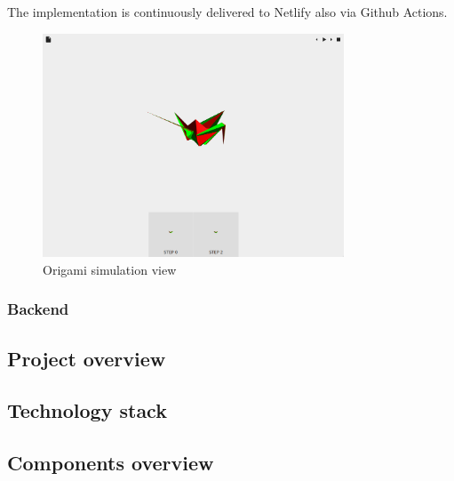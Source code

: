 The implementation is continuously delivered to Netlify also via Github Actions.


\begin{figure}[H]
\caption{Origami simulation view}
  \centering
    \includegraphics[width=0.8\textwidth]{assets/prototype-front.png}
\end{figure}

\subsubsection{Backend}

\subsection{Project overview}

\subsection{Technology stack}

\subsection{Components overview}


